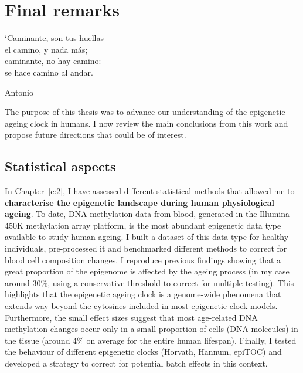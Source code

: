 
\chapter{Final remarks} \label{c:5}

\ifpdf
	\graphicspath{{Chapter5/Figs/pdf/}}
\else
	\graphicspath{{Chapter5/Figs/svg/}}
\fi

\epigraph{`Caminante, son tus huellas \\ el camino, y nada más; \\ caminante, no hay camino: \\ se hace camino al andar.}{Antonio \citet{Machado}}

\bigskip

The purpose of this thesis was to advance our understanding of the epigenetic ageing clock in humans. I now review the main conclusions from this work and propose future directions that could be of interest.


\section{Statistical aspects}

\bigskip

In Chapter~\ref{c:2}, I have assessed different statistical methods that allowed me to \textbf{characterise the epigenetic landscape during human physiological ageing}. To date, DNA methylation data from blood, generated in the Illumina 450K methylation array platform, is the most abundant epigenetic data type available to study human ageing. I built a dataset of this data type for healthy individuals, pre-processed it and benchmarked different methods to correct for blood cell composition changes. I reproduce previous findings showing that a great proportion of the epigenome is affected by the ageing process (in my case around 30\%, using a conservative threshold to correct for multiple testing). This highlights that the epigenetic ageing clock is a genome-wide phenomena that extends way beyond the cytosines included in most epigenetic clock models. Furthermore, the small effect sizes suggest that most age-related DNA methylation changes occur only in a small proportion of cells (DNA molecules) in the tissue (around 4\% on average for the entire human lifespan). Finally, I tested the behaviour of different epigenetic clocks (Horvath, Hannum, epiTOC) and developed a strategy to correct for potential batch effects in this context.

